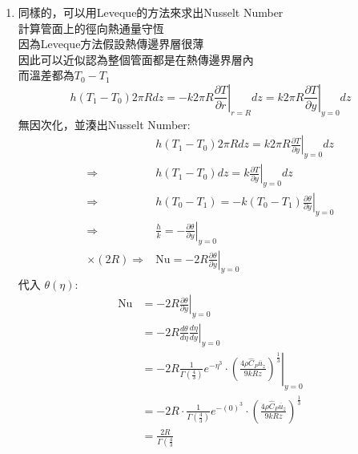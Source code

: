 \documentclass[../main.tex]{subfiles}
\begin{document}
\begin{itemize}
\begin{enumerate}
    可見熱傳邊界層發展得比流體邊界層還要慢
    \item 同樣的，可以用Leveque的方法來求出Nusselt Number\\
    計算管面上的徑向熱通量守恆\\
    因為Leveque方法假設熱傳邊界層很薄\\
    因此可以近似認為整個管面都是在熱傳邊界層內\\
    而溫差都為$T_0 - T_1$
    \begin{equation}
      h(T_1 - T_0) 2\pi R dz = -k \left.
        2\pi R \frac{\partial T}{\partial r}
      \right|_{r=R} dz = k \left.
        2\pi R \frac{\partial T}{\partial y}
      \right|_{y=0} dz
    \end{equation}
    無因次化，並湊出Nusselt Number:
    \begin{align}
      &h(T_1 - T_0) 2\pi R dz = k \left.
        2\pi R \frac{\partial T}{\partial y}
      \right|_{y=0} dz \nonumber\\
      \Rightarrow & h(T_1 - T_0)  dz = k \left.
         \frac{\partial T}{\partial y}
      \right|_{y=0} dz \nonumber\\
      \Rightarrow & h (T_0 - T_1) = -k (T_0 - T_1) \left.
         \frac{\partial \theta}{\partial y}
      \right|_{y=0} \nonumber\\
      \Rightarrow & \frac{h}{k} = - \left.
         \frac{\partial \theta}{\partial y}
      \right|_{y=0} \nonumber\\
      \times (2R) \Rightarrow & \text{Nu} = -2R \left.
         \frac{\partial \theta}{\partial y}
      \right|_{y=0}
    \end{align}
    代入 $\theta(\eta)$:
    \begin{align}
      \text{Nu} &= -2R \left.
         \frac{\partial \theta}{\partial y}
      \right|_{y=0} \nonumber\\
      &= -2R \left.
        \frac{d\theta}{d\eta} \frac{d\eta}{dy}
      \right|_{y=0} \nonumber\\
      &= -2R \left.
        \frac{1}{\Gamma\left(
          \frac{4}{3}
        \right)} e^{-\eta^3} \cdot \left(
          \frac{4\rho \hat C_P \overline u_z}{9 k R z}
        \right)^{\frac{1}{3}}
      \right|_{y=0} \nonumber\\
      &= -2R \cdot \frac{1}{\Gamma\left(
          \frac{4}{3}
        \right)} e^{-(0)^3} \cdot \left(
          \frac{4\rho \hat C_P \overline u_z}{9 k R z}
        \right)^{\frac{1}{3}} \nonumber\\
      &= \frac{2R}{\Gamma\left(
          \frac{4}{3}
}
\end{align}
\end{enumerate}
\end{itemize}
\end{document}
